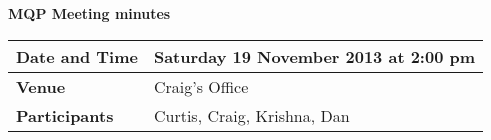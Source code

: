 \documentclass[a4wide,10pt]{extarticle}
\begin{document}
\thispagestyle{empty}

\begin{center}
\textbf{MQP Meeting minutes}
\vspace{0.33cm}
\end{center}

\begin{center}
\begin{tabular}{| m{2.8cm} | m{13.6cm} |} \hline
\textbf{Date and Time} & Saturday 19 November 2013 at 2:00 pm \\ \hline
\textbf{Venue} & Craig's Office \\ \hline
\textbf{Participants} & Curtis, Craig, Krishna, Dan\\ \hline
\end{tabular}
\end{center}
\end{document}
